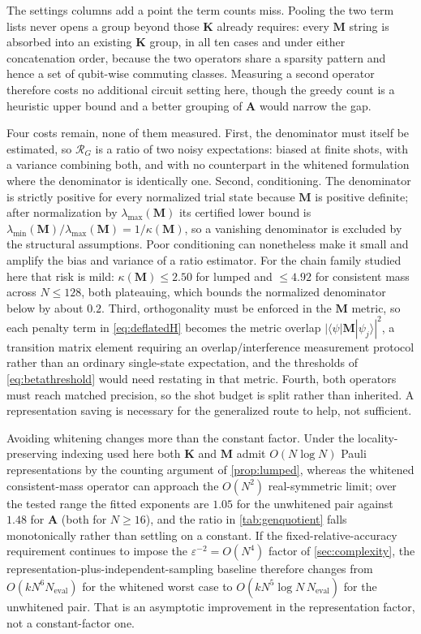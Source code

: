 \documentclass{ieeeaccess}
\newcommand{\M}{\mathbf{M}}
\newcommand{\K}{\mathbf{K}}
\newcommand{\A}{\mathbf{A}}
\begin{document}
The settings columns add a point the term counts miss. Pooling the two term lists never opens
a group beyond those $\K$ already requires: every $\M$ string is absorbed into an existing
$\K$ group, in all ten cases and under either concatenation order, because the two operators
share a sparsity pattern and hence a set of qubit-wise commuting classes. Measuring a second
operator therefore costs no additional circuit setting here, though the greedy count is a
heuristic upper bound and a better grouping of $\A$ would narrow the gap.

Four costs remain, none of them measured. First, the denominator must itself be estimated, so
$\mathcal R_G$ is a ratio of two noisy expectations: biased at finite shots, with a variance
combining both, and with no counterpart in the whitened formulation where the denominator is
identically one. Second, conditioning. The denominator is strictly positive for every normalized trial state
because $\M$ is positive definite; after normalization by $\lambda_{\max}(\M)$ its certified
lower bound is $\lambda_{\min}(\M)/\lambda_{\max}(\M)=1/\kappa(\M)$, so a vanishing denominator
is excluded by the structural assumptions. Poor conditioning can nonetheless make it small and
amplify the bias and variance of a ratio estimator. For the chain family studied here that risk
is mild: $\kappa(\M)\le2.50$ for lumped and $\le4.92$ for consistent mass across $N\le128$, both
plateauing, which bounds the normalized denominator below by about $0.2$. Third,
orthogonality must be enforced in the $\M$ metric, so each penalty term in \eqref{eq:deflatedH}
becomes the metric overlap $|\langle\psi|\M|\psi_j\rangle|^2$, a transition matrix element
requiring an overlap/interference measurement protocol rather than an ordinary single-state expectation, and the thresholds of \eqref{eq:betathreshold} would need restating in
that metric. Fourth, both operators must reach matched precision, so the shot budget is split
rather than inherited. A representation saving is necessary for the generalized route to help,
not sufficient.

Avoiding whitening changes more than the constant factor. Under the locality-preserving
indexing used here both $\K$ and $\M$ admit $O(N\log N)$ Pauli representations by the counting
argument of \cref{prop:lumped}, whereas the whitened consistent-mass operator can approach the
$O(N^2)$ real-symmetric limit; over the tested range the fitted exponents are $1.05$ for the
unwhitened pair against $1.48$ for $\A$ (both for $N\ge16$), and the ratio in
\cref{tab:genquotient} falls monotonically rather than settling on a constant. If the
fixed-relative-accuracy requirement continues to impose the $\varepsilon^{-2}=O(N^4)$ factor of
\cref{sec:complexity}, the representation-plus-independent-sampling baseline therefore changes
from $O(kN^6N_{\mathrm{eval}})$ for the whitened worst case to $O(kN^5\log N\,N_{\mathrm{eval}})$
for the unwhitened pair. That is an asymptotic improvement in the representation factor, not a
constant-factor one.
\end{document}

